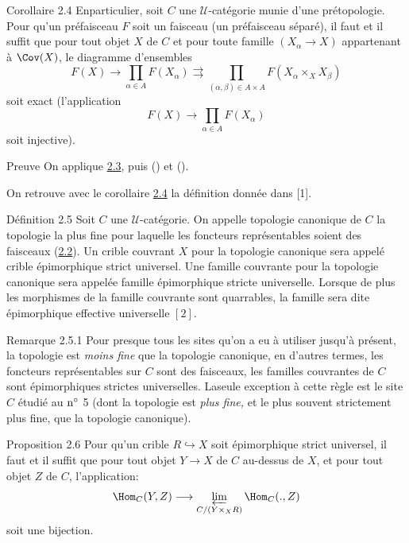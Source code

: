 \begin{enonce*}{Corollaire 2.4}
En\pageoriginale particulier, soit $C$ une $𝒰$-catégorie
munie d'une prétopologie. Pour qu'un préfaisceau $F$ soit un
faisceau (\resp un préfaisceau séparé), il faut et il suffit
que pour tout objet $X$ de $C$ et pour toute famille
$(X_{\alpha}\rightarrow X)$ appartenant à $\Cov(X)$, le diagramme
d'ensembles
$$
F(X)\rightarrow \prod_{\alpha\in A}F(X_{\alpha})\rightrightarrows
\prod_{(\alpha,\beta)\in A\times A}F(X_{\alpha}\times_X X_{\beta})
$$
soit exact (\resp l'application
$$
F(X)\longrightarrow \prod_{\alpha\in A}F(X_{\alpha})
$$
soit injective).
\end{enonce*}

\begin{enonce*}[remark]{Preuve}
On applique \hyperref[II.cor2.3]{2.3}, puis () et
().

On retrouve avec le corollaire \hyperref[II.cor2.4]{2.4} la définition
donnée dans [1].
\end{enonce*}

\begin{enonce*}{Définition 2.5}
Soit $C$ une $𝒰$-catégorie. On appelle topologie canonique
de $C$ la topologie la plus fine pour laquelle les foncteurs
représentables soient des faisceaux (\hyperref[II.prop2.2]{2.2}). Un crible
couvrant $X$ pour la topologie canonique sera appelé crible
épimorphique strict universel. Une famille couvrante pour la
topologie canonique sera appelée famille épimorphique stricte
universelle. Lorsque de plus les morphismes de la famille couvrante
sont quarrables, la famille sera dite épimorphique effective
universelle $[2]$.
\end{enonce*}

\begin{enonce*}[remark]{Remarque 2.5.1}
Pour presque tous les sites qu'on a eu à utiliser jusqu'à présent,
la topologie est \emph{moins fine} que la topologie canonique, en
d'autres termes, les foncteurs représentables sur $C$ sont des
faisceaux, \ie les familles couvrantes de $C$ sont épimorphiques
strictes universelles. La\pageoriginale seule exception à cette
règle est le site $\widehat{C}$ étudié au ${\rm n^{\circ}}$ 5
(dont la topologie est \emph{plus fine,} et le plus souvent
strictement plus fine, que la topologie canonique).
\end{enonce*}

\begin{enonce*}{Proposition 2.6}
Pour qu'un crible $R\hookrightarrow X$ soit épimorphique strict
universel, il faut et il suffit que pour tout objet $Y\rightarrow X$
de $C$ au-dessus de $X$, et pour tout objet $Z$ de $C$,
l'application:
$$
\Hom_C(Y,Z)\longrightarrow \varprojlim_{C/(Y\times_X R)}\Hom_C (.,
Z)
$$
soit une bijection.
\end{enonce*}

